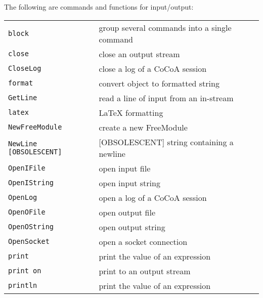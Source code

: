 \documentclass[a4paper]{mybook}
\begin{document}
        
The following are commands and functions for input/output:

\begin{center}
\begin{longtable}{ll}
   
{\verb~block~} &
      group several commands into a single command\\
   
{\verb~close~} &
      close an output stream\\
   
{\verb~CloseLog~} &
      close a log of a CoCoA session\\
   
{\verb~format~} &
      convert object to formatted string\\
   
{\verb~GetLine~} &
      read a line of input from an in-stream\\
   
{\verb~latex~} &
      LaTeX formatting\\
   
{\verb~NewFreeModule~} &
      create a new FreeModule\\
   
{\verb~NewLine [OBSOLESCENT]~} &
      [OBSOLESCENT] string containing a newline\\
   
{\verb~OpenIFile~} &
      open input file\\
   
{\verb~OpenIString~} &
      open input string\\
   
{\verb~OpenLog~} &
      open a log of a CoCoA session\\
   
{\verb~OpenOFile~} &
      open output file\\
   
{\verb~OpenOString~} &
      open output string\\
   
{\verb~OpenSocket~} &
      open a socket connection\\
   
{\verb~print~} &
      print the value of an expression\\
   
{\verb~print on~} &
      print to an output stream\\
   
{\verb~println~} &
      print the value of an expression\\
   

\end{longtable}
\end{center}
\end{document}
